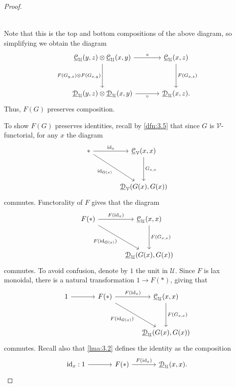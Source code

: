 \begin{proof}
\[\begin{tikzcd}[row sep = 2.5em, column sep = 3.5em]
	\end{tikzcd}\]
	Note that this is the top and bottom compositions of the above diagram, so simplifying we obtain the diagram
	\[\begin{tikzcd}[row sep = 3.5em, column sep = 3.5em]
	\underline{\mathcal{C} } _\mathcal{U} (y,z)\otimes \underline{\mathcal{C} } _\mathcal{U} (x,y)\ar[" F(G_{y\text{,} z} )\otimes F(G_{x\text{,} y} ) "', d] \ar[" \circ  ", r]  & \underline{\mathcal{C} }_\mathcal{U} (x,z)\ar[" F(G_{x\text{,} z} ) ", d]   \\
	\underline{\mathcal{D} } _\mathcal{U} (y,z)\otimes \underline{\mathcal{D} } _\mathcal{U} (x,y)\ar[" \circ  "', r]  & \underline{\mathcal{D} } _\mathcal{U} (x,z).
	\end{tikzcd}\]
	Thus, $F(G)$ preserves composition.

	To show $F(G)$ preserves identities, recall by \cref{dfn:3.5} that since $G$ is $\mathcal{V} $-functorial, for any $x$ the diagram
	\[\begin{tikzcd}[row sep = 3.5em, column sep = 3.5em]
	*\ar[" \mathrm{id} _x ", r] \ar[" \mathrm{id} _{G\left(x \right) }  "', dr]  & \underline{\mathcal{C} } _\mathcal{V} (x,x)\ar[" G_{x\text{,} x}  ", d]  \\
	 & \underline{\mathcal{D} } _\mathcal{V} (G(x),G(x))
	\end{tikzcd}\]
	commutes. Functorality of $F$ gives that the diagram
	\[\begin{tikzcd}[row sep = 3.5em, column sep = 3.5em]
	F(*)\ar[" F(\mathrm{id} _x) ", r] \ar[" F(\mathrm{id} _{G(x)}  )"', dr]  & \underline{\mathcal{C} } _\mathcal{U} (x,x)\ar[" F(G_{x\text{,} x} ) ", d]  \\
	 & \underline{\mathcal{D} } _\mathcal{U} (G(x),G(x))
	\end{tikzcd}\]
	commutes. To avoid confusion, denote by $1$ the unit in $\mathcal{U} $. Since $F$ is lax monoidal, there is a natural transformation $1\to F(*)$, giving that
	\[\begin{tikzcd}[row sep = 3.5em, column sep = 3.5em]
		1\ar[r] & F(*)\ar[" F(\mathrm{id} _x) ", r] \ar[" F(\mathrm{id} _{G(x)}  )"', dr]  & \underline{\mathcal{C} } _\mathcal{U} (x,x)\ar[" F(G_{x\text{,} x} ) ", d]  \\
			& & \underline{\mathcal{D} } _\mathcal{U} (G(x),G(x))
	\end{tikzcd}\]
	commutes. Recall also that \cref{lma:3.2} defines the identity as the composition
	\[\begin{tikzcd}[row sep = 2.5em, column sep = 3.5em]
	\mathrm{id} _x : 1\ar[r]  & F(*)\ar[" F(\mathrm{id} _x) ", r]  & \underline{\mathcal{D} } _\mathcal{U} (x,x).

\end{tikzcd}\]
\end{proof}
